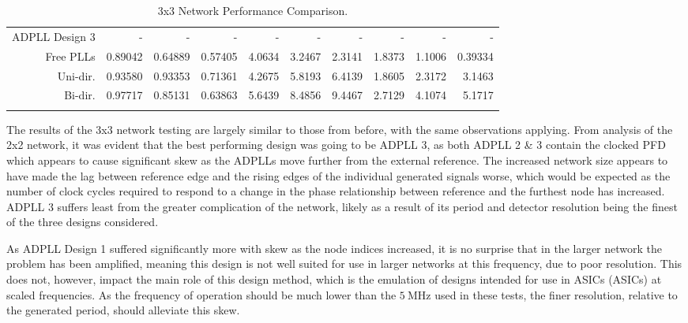 \begin{table}[!ht]
\begin{center}
\begin{footnotesize}
\begin{tabular}{ll|r|r|r|r|r|r|r|r|r|}
                \hline
                \multicolumn{2}{|l|}{\ac{ADPLL} Design 3}&-&-&-&-&-&-&-&-&-\T\\
                \multicolumn{2}{|r|}{Free PLLs} &0.89042 &0.64889 &0.57405    &4.0634 &3.2467 &2.3141    &1.8373&1.1006&0.39334  \T\\
                \multicolumn{2}{|r|}{Uni-dir.}  &0.93580 &0.93353 &0.71361    &4.2675 &5.8193 &6.4139    &1.8605&2.3172&3.1463   \T\\
                \multicolumn{2}{|r|}{Bi-dir.}   &0.97717 &0.85131 &0.63863    &5.6439 &8.4856 &9.4467    &2.7129&4.1074&5.1717   \T\\
                \hline
                \B                
            \end{tabular}
        \end{footnotesize}
        \caption{3x3 Network Performance Comparison.}
        \label{table:3x3perf}
    \end{center}
    \vspace{-0.5cm}
\end{table}
The results of the 3x3 network testing are largely similar to those from before, with the same observations applying. From analysis of the 2x2 network, it was evident that the best performing design was going to be \ac{ADPLL} 3, as both \ac{ADPLL} 2 \& 3 contain the clocked \ac{PFD} which appears to cause significant skew as the \acp{ADPLL} move further from the external reference. The increased network size appears to have made the lag between reference edge and the rising edges of the individual generated signals worse, which would be expected as the number of clock cycles required to respond to a change in the phase relationship between reference and the furthest node has increased. \ac{ADPLL} 3 suffers least from the greater complication of the network, likely as a result of its period and detector resolution being the finest of the three designs considered.

As \ac{ADPLL} Design 1 suffered significantly more with skew as the node indices increased, it is no surprise that in the larger network the problem has been amplified, meaning this design is not well suited for use in larger networks at this frequency, due to poor resolution. This does not, however, impact the main role of this design method, which is the emulation of designs intended for use in \aclp{ASIC} (\acsp{ASIC}) at scaled frequencies. As the frequency of operation should be much lower than the $5~\si{\mega\hertz}$ used in these tests, the finer resolution, relative to the generated period, should alleviate this skew.

